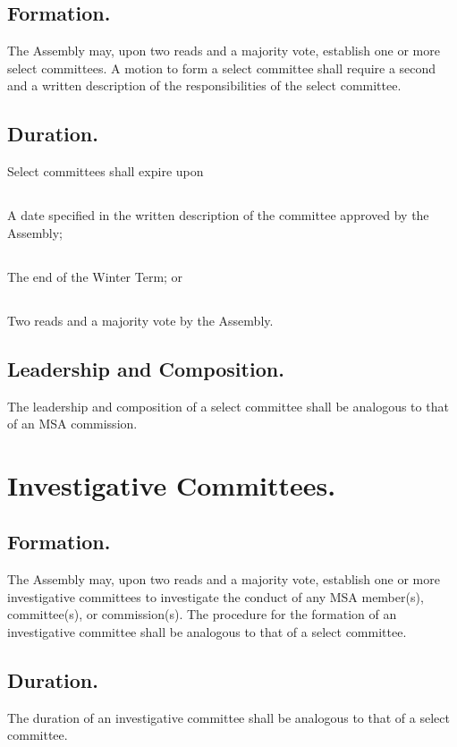 \documentclass{rules}
\begin{document}
\subsection{Formation.}
The Assembly may, upon two reads and a majority vote, establish one or more select committees.  A motion to form a select committee shall require a second and a written description of the responsibilities of the select committee.
\subsection{Duration.}
Select committees shall expire upon
\subsection{}
A date specified in the written description of the committee approved by the Assembly;
\subsection{}
The end of the Winter Term; or 
\subsection{}
Two reads and a majority vote by the Assembly.
\subsection{Leadership and Composition.}
The leadership and composition of a select committee shall be analogous to that of an MSA commission.  


\section{Investigative Committees.}
\subsection{Formation.}
The Assembly may, upon two reads and a majority vote, establish one or more investigative committees to investigate the conduct of any MSA member(s), committee(s), or commission(s).  The procedure for the formation of an investigative committee shall be analogous to that of a select committee.
\subsection{Duration.}
The duration of an investigative committee shall be analogous to that of a select committee.
\end{document}
